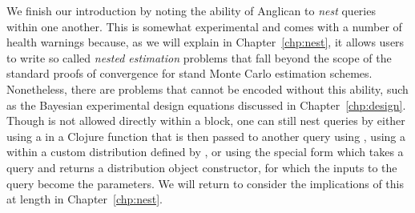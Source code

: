 We finish our introduction by noting the ability of Anglican to \emph{nest} queries within one another.  This
is somewhat experimental and comes with a number of health warnings because, as we will explain in Chapter~\ref{chp:nest},
it allows users to write so called \emph{nested estimation} problems that fall beyond the scope of the standard
proofs of convergence for stand Monte Carlo estimation schemes. Nonetheless, there are problems that cannot
be encoded without this ability, such as the Bayesian experimental design equations discussed in Chapter~\ref{chp:design}.
Though \doquery is not allowed directly within a  block, one can still nest queries by 
either using a \doquery in a Clojure function that is then passed to another query using {\small {}},
using a \doquery within a custom distribution defined by , or using the special form \conditional which
takes a query and returns a distribution object constructor, for which the inputs to the query become the parameters.
We will return to consider the implications of this at length in Chapter~\ref{chp:nest}.